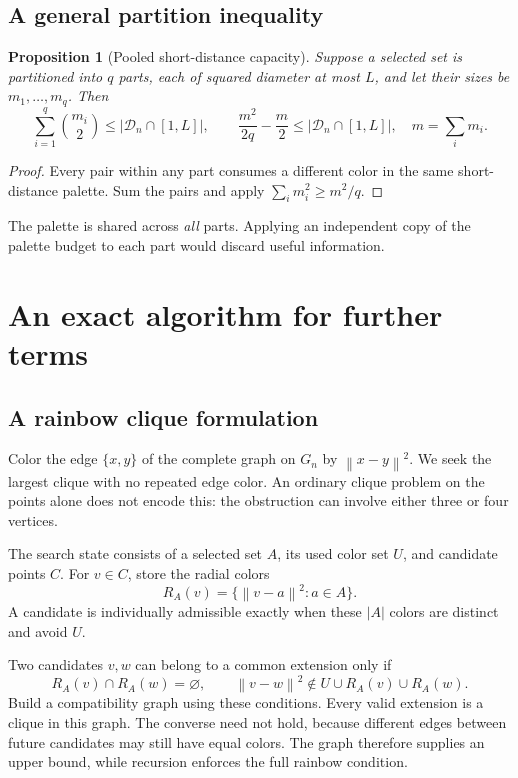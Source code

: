\documentclass[11pt,letterpaper]{article}
\newtheorem{proposition}[theorem]{Proposition}
\theoremstyle{definition}
\newcommand{\norm}[1]{\left\lVert #1\right\rVert}
\newcommand{\calD}{\mathcal D}
\begin{document}
\subsection{A general partition inequality}
\begin{proposition}[Pooled short-distance capacity]
\label{prop:partition}
Suppose a selected set is partitioned into \(q\) parts, each of squared
diameter at most \(L\), and let their sizes be \(m_1,\ldots,m_q\).
Then
\[
 \sum_{i=1}^q\binom{m_i}{2}
 \le |\calD_n\cap[1,L]|,\qquad
 \frac{m^2}{2q}-\frac m2\le|\calD_n\cap[1,L]|,
 \quad m=\sum_i m_i.
\]
\end{proposition}
\begin{proof}
Every pair within any part consumes a different color in the same
short-distance palette. Sum the pairs and apply
\(\sum_i m_i^2\ge m^2/q\).
\end{proof}
The palette is shared across \emph{all} parts. Applying an independent
copy of the palette budget to each part would discard useful information.

\section{An exact algorithm for further terms}
\label{sec:algorithm}

\subsection{A rainbow clique formulation}
Color the edge \(\{x,y\}\) of the complete graph on \(G_n\) by
\(\norm{x-y}^2\). We seek the largest clique with no repeated edge color.
An ordinary clique problem on the points alone does not encode this:
the obstruction can involve either three or four vertices.

The search state consists of a selected set \(A\), its used color set
\(U\), and candidate points \(C\). For \(v\in C\), store the radial colors
\[
 R_A(v)=\{\norm{v-a}^2:a\in A\}.
\]
A candidate is individually admissible exactly when these \(|A|\)
colors are distinct and avoid \(U\).

Two candidates \(v,w\) can belong to a common extension only if
\begin{equation}
 R_A(v)\cap R_A(w)=\varnothing,\qquad
 \norm{v-w}^2\notin U\cup R_A(v)\cup R_A(w).
 \label{eq:compatibility}
\end{equation}
Build a compatibility graph using these conditions. Every valid extension
is a clique in this graph. The converse need not hold, because different
edges between future candidates may still have equal colors. The graph
therefore supplies an upper bound, while recursion enforces the full
rainbow condition.
\end{document}

